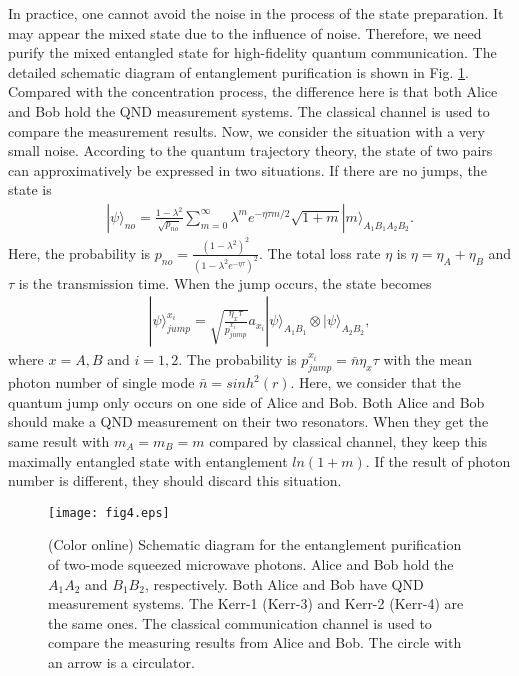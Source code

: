 \documentclass[preprintnumbers,showkeys,amsmath,amssymb]{revtex4}%
\begin{document}
In practice, one cannot avoid the noise in the process of the state
preparation. It may appear the mixed state due to the influence of
noise. Therefore, we need purify the mixed entangled state for
high-fidelity quantum communication. The detailed schematic diagram
of entanglement purification is shown in Fig. \ref{purification}.
Compared with the concentration process, the difference here is that
both Alice and Bob hold the QND measurement systems. The classical
channel is used to compare the measurement results. Now, we consider
the situation with a very small noise. According to the quantum
trajectory theory, the state of two pairs can approximatively be
expressed in two situations. If there are no jumps, the state is
\cite{LMDuanPRL2000,LMDuanPRA2000}
\begin{eqnarray}    \label{}
|\psi\rangle_{no}\!=\!\frac{1\!-\!\lambda^{2}}{\sqrt{p_{no}}}\!\sum^{\infty}_{m=0}\!\lambda^{m}e^{-\eta\tau m/2}\sqrt{1+m}|m\rangle_{\!A_{1}\!B_{1}\!A_{2}\!B_{2}}.
\end{eqnarray}
Here, the probability is
$p_{no}=\frac{(1-\lambda^{2})^{2}}{(1-\lambda^{2}e^{-\eta\tau})^{2}}$.
The total loss rate $\eta$ is $\eta=\eta_{A}+\eta_{B}$ and $\tau$
is the transmission time. When the jump occurs, the state becomes
\cite{LMDuanPRL2000,LMDuanPRA2000}
\begin{eqnarray}    \label{mixed}
|\psi\rangle^{x_{i}}_{jump}\!=\!\sqrt{\frac{\eta_{x}\tau}{p^{x_{i}}_{jump}}}a_{x_{i}}|\psi\rangle_{\!A_{1}\!B_{1}}\otimes|\psi\rangle_{\!A_{2}\!B_{2}},
\end{eqnarray}
where $x=A,B$ and $i=1,2$. The probability is
$p^{x_{i}}_{jump}=\bar{n}\eta_{x}\tau$ with the mean photon number
of single mode $\bar{n}=sinh^{2}(r)$. Here, we consider that the
quantum jump only occurs on one side of Alice and Bob. Both Alice
and Bob should make a QND measurement on their two resonators. When
they get the same result with $m_{A}=m_{B}=m$ compared by classical
channel, they keep this maximally entangled state with entanglement
$ln(1+m)$. If the result of photon number is different, they should
discard this situation.




\begin{figure}[!ht]%
\centering\texttt{[image: fig4.eps]}
\caption{(Color online) Schematic diagram for the entanglement purification of
two-mode squeezed microwave photons.  Alice and Bob hold the
$A_{1}A_{2}$ and $B_{1}B_{2}$, respectively. Both Alice and Bob have
QND measurement systems. The Kerr-1 (Kerr-3) and Kerr-2 (Kerr-4) are
the same ones. The classical communication channel is used to
compare the measuring results from Alice and Bob. The circle with an
arrow is a circulator.} \label{purification}
\end{figure}
\end{document}

